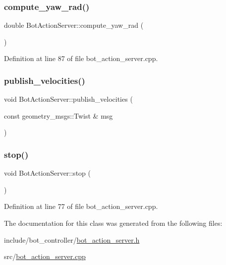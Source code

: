 \subsubsection{\texorpdfstring{compute\+\_\+yaw\+\_\+rad()}{compute\_yaw\_rad()}}
{\footnotesize\ttfamily double Bot\+Action\+Server\+::compute\+\_\+yaw\+\_\+rad (\begin{DoxyParamCaption}{ }\end{DoxyParamCaption})}



Definition at line 87 of file bot\+\_\+action\+\_\+server.\+cpp.

\mbox{\label{class_bot_action_server_a821f9e38243f2b5ffadfbe62aa3ec1b2}} 
\subsubsection{\texorpdfstring{publish\+\_\+velocities()}{publish\_velocities()}}
{\footnotesize\ttfamily void Bot\+Action\+Server\+::publish\+\_\+velocities (\begin{DoxyParamCaption}\item[{const geometry\+\_\+msgs\+::\+Twist \&}]{msg }\end{DoxyParamCaption})}

\mbox{\label{class_bot_action_server_a3e91308d1567b72b949cd19c63a808b1}} 
\subsubsection{\texorpdfstring{stop()}{stop()}}
{\footnotesize\ttfamily void Bot\+Action\+Server\+::stop (\begin{DoxyParamCaption}{ }\end{DoxyParamCaption})}



Definition at line 77 of file bot\+\_\+action\+\_\+server.\+cpp.



The documentation for this class was generated from the following files\+:\begin{DoxyCompactItemize}
\item 
include/bot\+\_\+controller/\hyperlink{bot__action__server_8h}{bot\+\_\+action\+\_\+server.\+h}\item 
src/\hyperlink{bot__action__server_8cpp}{bot\+\_\+action\+\_\+server.\+cpp}\end{DoxyCompactItemize}
